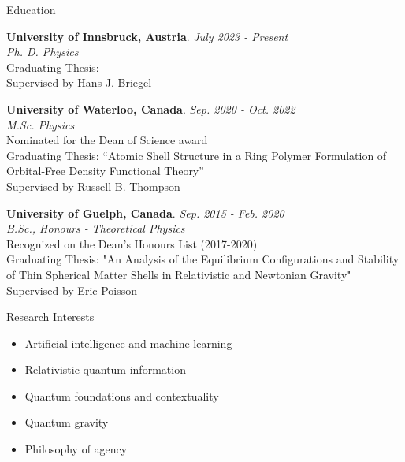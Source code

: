 \documentclass{resume} %
\begin{document}

\begin{rSection}{Education}

{\bf University of Innsbruck, Austria}.
\hfill {\em July 2023 - Present}
\\
\textit{Ph. D. Physics} \\
Graduating Thesis:  \\ Supervised by Hans J. Briegel

{\bf University of Waterloo, Canada}.
\hfill {\em Sep. 2020 - Oct. 2022}
\\
\textit{M.Sc. Physics} \\
Nominated for the Dean of Science award \\
Graduating Thesis: “Atomic Shell Structure in a Ring Polymer Formulation of Orbital-Free Density Functional Theory” \\ Supervised by Russell B. Thompson

{\bf University of Guelph, Canada}.
\hfill {\em Sep. 2015 - Feb. 2020}
\\
\textit{B.Sc., Honours - Theoretical Physics} \\
Recognized on the Dean's Honours List (2017-2020)\\
Graduating Thesis: "An Analysis of the Equilibrium Configurations
and Stability of Thin Spherical Matter Shells in
Relativistic and Newtonian Gravity" \\ Supervised by Eric Poisson

\end{rSection}

\vspace{1em}

\begin{rSection}{Research Interests}
\begin{itemize}
\item {Artificial intelligence and machine learning}
\item {Relativistic quantum information}
\item {Quantum foundations and contextuality}
\item {Quantum gravity}
\item {Philosophy of agency}
\end{itemize}
\end{rSection}

\vspace{1em}
\end{document}
